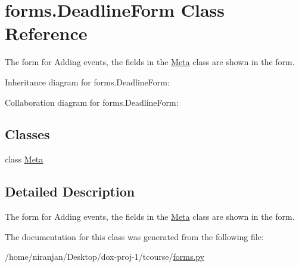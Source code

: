 \hypertarget{classforms_1_1_deadline_form}{}\section{forms.\+Deadline\+Form Class Reference}
\label{classforms_1_1_deadline_form}


The form for Adding events, the fields in the \hyperlink{classforms_1_1_deadline_form_1_1_meta}{Meta} class are shown in the form.  




Inheritance diagram for forms.\+Deadline\+Form\+:


Collaboration diagram for forms.\+Deadline\+Form\+:
\subsection*{Classes}
\begin{DoxyCompactItemize}
\item 
class \hyperlink{classforms_1_1_deadline_form_1_1_meta}{Meta}
\end{DoxyCompactItemize}


\subsection{Detailed Description}
The form for Adding events, the fields in the \hyperlink{classforms_1_1_deadline_form_1_1_meta}{Meta} class are shown in the form. 

The documentation for this class was generated from the following file\+:\begin{DoxyCompactItemize}
\item 
/home/niranjan/\+Desktop/dox-\/proj-\/1/tcourse/\hyperlink{forms_8py}{forms.\+py}\end{DoxyCompactItemize}
